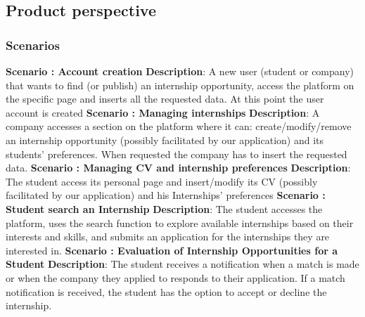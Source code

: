 \documentclass{article}
\begin{document}
\subsection{Product perspective}

\subsubsection{Scenarios} 

\setcounter{scenario}{1}

\textbf{Scenario \thescenario: Account creation }  \newline
\textbf{Description}: A new user (student or company) that wants to find (or publish) an internship opportunity, access the platform on the specific page and inserts all the requested data. At this point the user account is created \newline
\newline
{}
\textbf{Scenario \thescenario: Managing internships }  \newline
\textbf{Description}: A company accesses a section on the platform where it can: create/modify/remove an internship opportunity  (possibly facilitated by our application) and its students' preferences. When requested the company has to insert the requested data.
\newline
\newline
{}
\textbf{Scenario \thescenario: Managing CV and internship preferences}  \newline
\textbf{Description}: The student access its personal page and insert/modify its CV (possibly facilitated by our application) and his Internships' preferences\newline
\newline
{}
\textbf{Scenario \thescenario: Student search an Internship}  \newline
\textbf{Description}: The student accesses the platform, uses the search function to explore available internships based on their interests and skills, and submits an application for the internships they are interested in.
\newline
\newline
{}
\textbf{Scenario \thescenario: Evaluation of Internship Opportunities for a Student}\newline
\textbf{Description}: The student receives a notification when a match is made or when the company they applied to responds to their application. If a match notification is received, the student has the option to accept or decline the internship.\newline
\end{document}
